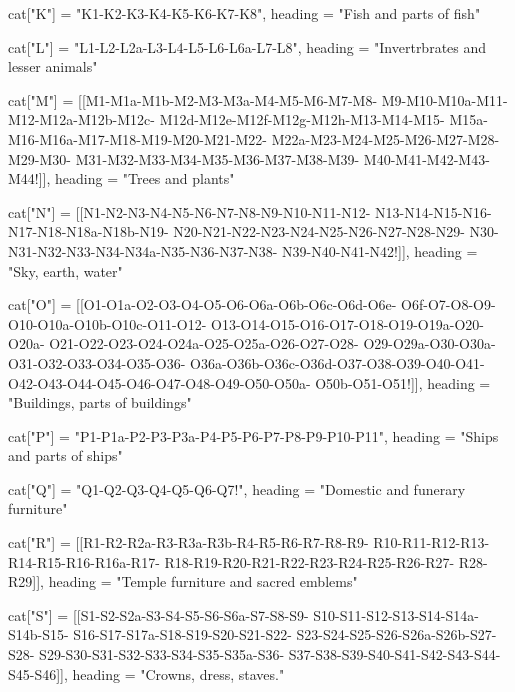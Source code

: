 \documentclass{article}
\begin{document}
\begin{luacode*}
cat["K"] 	 =   {"K1-K2-K3-K4-K5-K6-K7-K8",
                 heading = "Fish and parts of fish"}

cat["L"] 	 =   {"L1-L2-L2a-L3-L4-L5-L6-L6a-L7-L8",
                 heading = "Invertrbrates and lesser animals"}

cat["M"] 	 =   {[[M1-M1a-M1b-M2-M3-M3a-M4-M5-M6-M7-M8-
                 M9-M10-M10a-M11-M12-M12a-M12b-M12c-
                 M12d-M12e-M12f-M12g-M12h-M13-M14-M15-
                 M15a-M16-M16a-M17-M18-M19-M20-M21-M22-
                 M22a-M23-M24-M25-M26-M27-M28-M29-M30-
                 M31-M32-M33-M34-M35-M36-M37-M38-M39-
                 M40-M41-M42-M43-M44!]],
                 heading = "Trees and plants"}

cat["N"] =     {[[N1-N2-N3-N4-N5-N6-N7-N8-N9-N10-N11-N12-
                 N13-N14-N15-N16-N17-N18-N18a-N18b-N19-
				    N20-N21-N22-N23-N24-N25-N26-N27-N28-N29-
                 N30-N31-N32-N33-N34-N34a-N35-N36-N37-N38-
                 N39-N40-N41-N42!]], 
                 heading = "Sky, earth, water"}

cat["O"] = 	  {[[O1-O1a-O2-O3-O4-O5-O6-O6a-O6b-O6c-O6d-O6e-
                  O6f-O7-O8-O9-O10-O10a-O10b-O10c-O11-O12-
                  O13-O14-O15-O16-O17-O18-O19-O19a-O20-O20a-
                  O21-O22-O23-O24-O24a-O25-O25a-O26-O27-O28-
                  O29-O29a-O30-O30a-O31-O32-O33-O34-O35-O36-
                  O36a-O36b-O36c-O36d-O37-O38-O39-O40-O41-
                  O42-O43-O44-O45-O46-O47-O48-O49-O50-O50a-
                  O50b-O51-O51!]],
                  heading = "Buildings, parts of buildings"}

cat["P"]   =   {"P1-P1a-P2-P3-P3a-P4-P5-P6-P7-P8-P9-P10-P11",
                heading = "Ships and parts of ships"}

cat["Q"]   =   {"Q1-Q2-Q3-Q4-Q5-Q6-Q7!",
                heading = "Domestic and funerary furniture"}

cat["R"]	 =   {[[R1-R2-R2a-R3-R3a-R3b-R4-R5-R6-R7-R8-R9-
                  R10-R11-R12-R13-R14-R15-R16-R16a-R17-
                  R18-R19-R20-R21-R22-R23-R24-R25-R26-R27-
                  R28-R29]],
                  heading = "Temple furniture and sacred emblems"}

cat["S"]   =   {[[S1-S2-S2a-S3-S4-S5-S6-S6a-S7-S8-S9-
                 S10-S11-S12-S13-S14-S14a-S14b-S15-
                 S16-S17-S17a-S18-S19-S20-S21-S22-
                 S23-S24-S25-S26-S26a-S26b-S27-S28-
                 S29-S30-S31-S32-S33-S34-S35-S35a-S36-
                 S37-S38-S39-S40-S41-S42-S43-S44-S45-S46]],
                heading = "Crowns, dress, staves."}


\end{luacode*}
\end{document}
